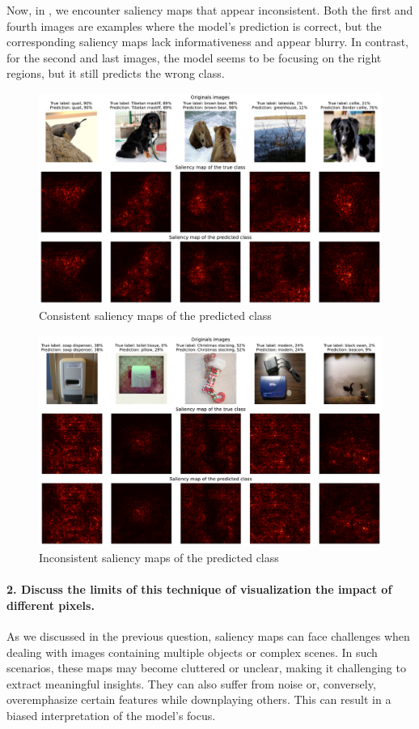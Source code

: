 Now, in , we encounter saliency maps that appear inconsistent. Both the first and fourth images are examples where the model's prediction is correct, but the corresponding saliency maps lack informativeness and appear blurry. In contrast, for the second and last images, the model seems to be focusing on the right regions, but it still predicts the wrong class.

\begin{figure}[H]
    \centering
    \includegraphics[width=.95\textwidth]{good_saliency_map.pdf}
    \caption{Consistent saliency maps of the predicted class}
    \label{fig:good_saliency_map}
\end{figure}

\begin{figure}[H]
    \centering  
    \includegraphics[width=.95\textwidth]{bad_saliency_map.pdf}
    \caption{Inconsistent saliency maps of the predicted class}
    \label{fig:bad_saliency_map}
\end{figure}

\paragraph*{2. Discuss the limits of this technique of visualization the impact of different pixels.}
As we discussed in the previous question, saliency maps can face challenges when dealing with images containing multiple objects or complex scenes. In such scenarios, these maps may become cluttered or unclear, making it challenging to extract meaningful insights. They can also suffer from noise or, conversely, overemphasize certain features while downplaying others. This can result in a biased interpretation of the model's focus.

